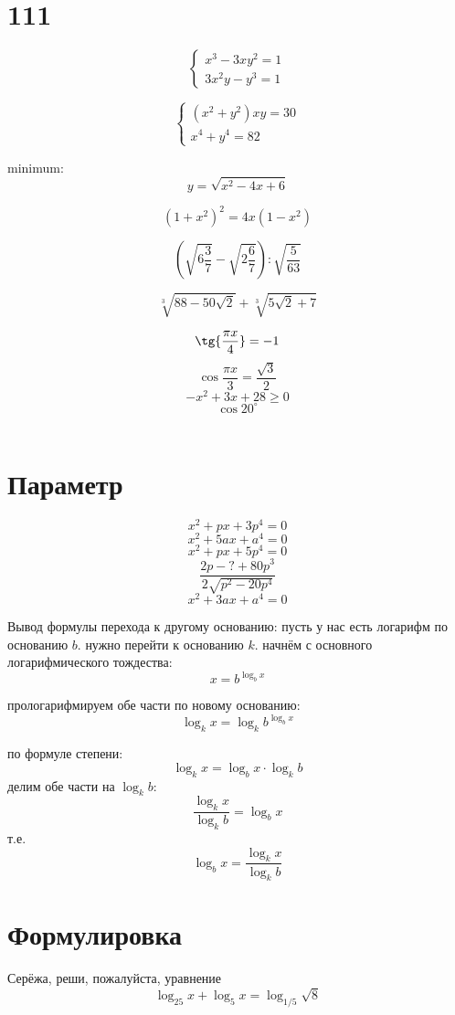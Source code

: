 \documentclass{article}
\begin{document}
\section{111}

\begin{equation*}
\begin{cases}
x^3-3{}x{}y^2=1 \\
3x^2y-y^3=1 \end{cases}
\end{equation*}

\begin{equation*}
\begin{cases}
(x^2+y^2)xy=30 \\
x^4+y^4=82
\end{cases}
\end{equation*}

minimum:
$$y=\sqrt{x^2-4x+6}$$


$$(1+x^2)^2=4x(1-x^2)$$

$$\left(\sqrt{6\frac{3}{7}}-\sqrt{2\frac{6}{7}}\right):\sqrt{\frac{5}{63}}$$

$$\sqrt[3]{88-50\sqrt{2}}+\sqrt[3]{5\sqrt{2}+7}$$

$$\tg{\frac{\pi{}x}{4}}=-1$$
$$\cos{\frac{\pi{}x}{3}}=\frac{\sqrt{3}}{2}$$
$$-x^2+3x+28\ge{}0$$
$$\cos{20^{\circ}}$$
\

\section{Параметр}
$$x^2+px+3p^4=0$$
$$x^2+5ax+a^4=0$$
$$x^2+px+5p^4=0$$
$$\frac{2p-?+80p^3}{2\sqrt{p^2-20p^4}}$$
$$x^2+3ax+a^4=0$$

\newpage
Вывод формулы перехода к другому основанию: пусть у нас есть логарифм по основанию $b$. нужно перейти к основанию $k$. начнём с основного логарифмического тождества:
$$x=b^{\log_{b}{x}}$$

прологарифмируем обе части по новому основанию:
$$\log_{k}{x}=\log_{k}{b^{\log_{b}{x}}}$$

по формуле степени:
$$\log_{k}{x}=\log_{b}{x}\cdot\log_{k}{b}$$
делим обе части на $\log_k{b}$:
$$\frac{\log_{k}{x}}{\log_k{b}}=\log_{b}{x}$$
т.е.
$$\log_{b}{x}=\frac{\log_{k}{x}}{\log_k{b}}$$

\section{Формулировка}
Серёжа, реши, пожалуйста, уравнение
$$\log_{25}{x}+\log_{5}{x}=\log_{1/5}{\sqrt{8}}$$
\end{document}
